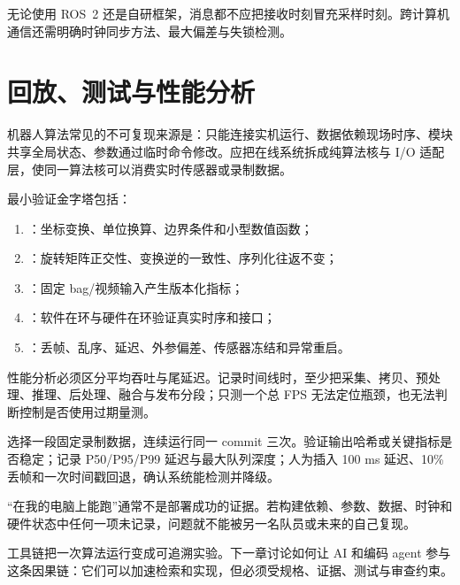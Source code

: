 无论使用 ROS~2 还是自研框架，消息都不应把接收时刻冒充采样时刻。跨计算机通信还需明确时钟同步方法、最大偏差与失锁检测。

\section{回放、测试与性能分析}

机器人算法常见的不可复现来源是：只能连接实机运行、数据依赖现场时序、模块共享全局状态、参数通过临时命令修改。应把在线系统拆成纯算法核与 I/O 适配层，使同一算法核可以消费实时传感器或录制数据。

最小验证金字塔包括：

\begin{enumerate}
  \item {}：坐标变换、单位换算、边界条件和小型数值函数；
  \item {}：旋转矩阵正交性、变换逆的一致性、序列化往返不变；
  \item {}：固定 bag/视频输入产生版本化指标；
  \item {}：软件在环与硬件在环验证真实时序和接口；
  \item {}：丢帧、乱序、延迟、外参偏差、传感器冻结和异常重启。
\end{enumerate}

性能分析必须区分平均吞吐与尾延迟。记录时间线时，至少把采集、拷贝、预处理、推理、后处理、融合与发布分段；只测一个总 FPS 无法定位瓶颈，也无法判断控制是否使用过期量测。

\begin{engineeringcheck}
选择一段固定录制数据，连续运行同一 commit 三次。验证输出哈希或关键指标是否稳定；记录 P50/P95/P99 延迟与最大队列深度；人为插入 100 ms 延迟、10\% 丢帧和一次时间戳回退，确认系统能检测并降级。
\end{engineeringcheck}

\begin{failuremode}
“在我的电脑上能跑”通常不是部署成功的证据。若构建依赖、参数、数据、时钟和硬件状态中任何一项未记录，问题就不能被另一名队员或未来的自己复现。
\end{failuremode}

\begin{chaptertransition}
工具链把一次算法运行变成可追溯实验。下一章讨论如何让 AI 和编码 agent 参与这条因果链：它们可以加速检索和实现，但必须受规格、证据、测试与审查约束。
\end{chaptertransition}
